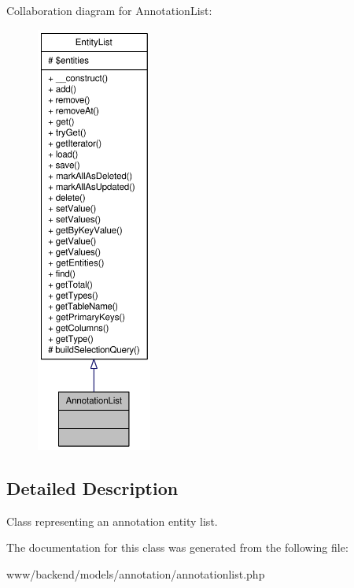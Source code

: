 Collaboration diagram for AnnotationList:\nopagebreak
\begin{figure}[H]
\begin{center}
\leavevmode
\includegraphics[height=400pt]{classAnnotationList__coll__graph}
\end{center}
\end{figure}


\subsection{Detailed Description}
Class representing an annotation entity list. 

The documentation for this class was generated from the following file:\begin{DoxyCompactItemize}
\item 
www/backend/models/annotation/annotationlist.php\end{DoxyCompactItemize}
